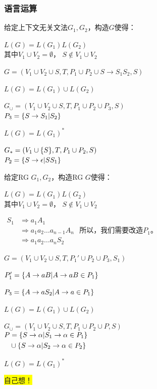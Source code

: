 \documentclass{ctexart}
\newcommand{\hl}[1]{\colorbox{yellow}{#1}}
\newcommand{\tto}{\Rightarrow}
\DeclarePairedDelimiter{\set}{\{}{\}}
\DeclarePairedDelimiter{\paren}{(}{)}
\begin{document}
\subsubsection{语言运算}
给定上下文无关文法$G_1,G_2$，构造$G$使得：
\begin{outline}[enumerate]
    \1 $L(G) = L(G_1)L(G_2)$ \\
        其中$V_1 \cup V_2 = \emptyset$， $S \notin V_1 \cup V_2$

        $G = (V_1 \cup V_2 \cup {S}, T, P_1 \cup P_2 \cup {S \to S_1S_2}, S)$

    \1 $L(G) = L(G_1) \cup L(G_2)$

        $G_\cup = (V_1 \cup V_2 \cup {S}, T, P_1 \cup P_2 \cup P_3, S)$ \\
        $P_3 = \set*{S \to S_1 | S_2}$

    \1 $L(G) = L(G_1)^*$

        $G_* = \paren*{V_1 \cup \set*{S}, T, P_1 \cup P_2, S}$ \\
        $P_2 = \set*{S \to \epsilon | SS_1}$

\end{outline}

给定RG $G_1,G_2$，构造RG $G$使得：
\begin{outline}[enumerate]
    \1 $L(G) = L(G_1)L(G_2)$ \\
        其中$V_1 \cup V_2 = \emptyset$， $S \notin V_1 \cup V_2$

        $\begin{aligned}
            S_1  & \tto a_1A_1 \\
                 & \tto a_1a_2\dots a_{n-1}A_n  \\
                 & \tto a_1a_2\dots a_nS_2
        \end{aligned}$
        所以，我们需要改造$P_1$。

        $G = (V_1 \cup V_2 \cup {S}, T, P_1' \cup P_2 \cup P_3, S_1)$

        $P_1' = \set*{A \to a B | A \to a B \in P_1}$
        
        $P_3 = \set*{A \to a S_2 | A \to a \in P_1}$

    \1 $L(G) = L(G_1) \cup L(G_2)$

        $G_\cup = (V_1 \cup V_2 \cup {S}, T, P_1 \cup P_2 \cup P, S)$ \\
        $\begin{aligned}
            P & = \set*{S \to \alpha | S_1 \to \alpha \in P_1} \\
            & \cup \set*{S \to \alpha | S_2 \to \alpha \in P_2} \\
        \end{aligned}$

    \1 $L(G) = L(G_1)^*$

        \hl{自己想！}
\end{outline}
\end{document}
